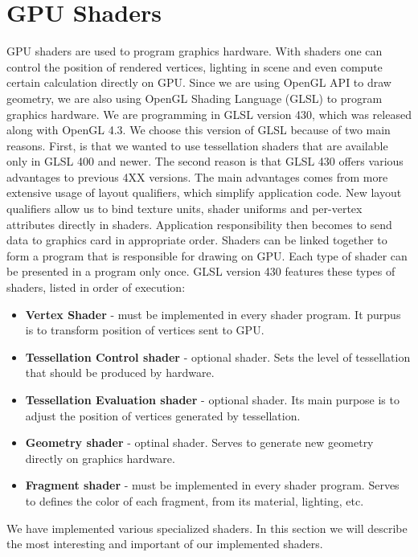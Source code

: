 \section{GPU Shaders}

GPU shaders are used to program graphics hardware.
With shaders one can control the position of rendered vertices, lighting in scene and even compute certain calculation directly on GPU.
Since we are using OpenGL API to draw geometry, we are also using OpenGL Shading Language (GLSL) to program graphics hardware.
We are programming in GLSL version 430, which was released along with OpenGL 4.3.
We choose this version of GLSL because of two main reasons.
First, is that we wanted to use tessellation shaders that are available only in GLSL 400 and newer.
The second reason is that GLSL 430 offers various advantages to previous 4XX versions.
The main advantages comes from more extensive usage of layout qualifiers, which simplify application code.
New layout qualifiers allow us to bind texture units, shader uniforms and per-vertex attributes directly in shaders.
Application responsibility then becomes to send data to graphics card in appropriate order.
Shaders can be linked together to form a program that is responsible for drawing on GPU.
Each type of shader can be presented in a program only once.
GLSL version 430 features these types of shaders, listed in order of execution:
\begin{itemize}
	\itemsep-0.25em 
	\item \textbf{Vertex Shader} - must be implemented in every shader program. It purpus is to transform position of vertices sent to GPU.
	\item \textbf{Tessellation Control shader} - optional shader. Sets the level of tessellation that should be produced by hardware.
	\item \textbf{Tessellation Evaluation shader} - optional shader. Its main purpose is to adjust the position of vertices generated by tessellation.
	\item \textbf{Geometry shader} - optinal shader. Serves to generate new geometry directly on graphics hardware.
	\item \textbf{Fragment shader} - must be implemented in every shader program. Serves to defines the color of each fragment, from its material, lighting, etc.
\end{itemize}
We have implemented various specialized shaders.
In this section we will describe the most interesting and important of our implemented shaders.

